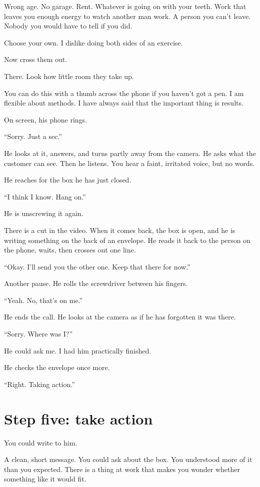 \documentclass[11pt,oneside]{book}
\begin{document}
Wrong age. No garage. Rent. Whatever is going on with your teeth. Work that leaves you enough energy to watch another man work. A person you can't leave. Nobody you would have to tell if you did.

Choose your own. I dislike doing both sides of an exercise.

Now cross them out.

There. Look how little room they take up.

You can do this with a thumb across the phone if you haven't got a pen. I am flexible about methods. I have always said that the important thing is results.

On screen, his phone rings.

``Sorry. Just a sec.''

He looks at it, answers, and turns partly away from the camera. He asks what the customer can see. Then he listens. You hear a faint, irritated voice, but no words.

He reaches for the box he has just closed.

``I think I know. Hang on.''

He is unscrewing it again.

There is a cut in the video. When it comes back, the box is open, and he is writing something on the back of an envelope. He reads it back to the person on the phone, waits, then crosses out one line.

``Okay. I'll send you the other one. Keep that there for now.''

Another pause. He rolls the screwdriver between his fingers.

``Yeah. No, that's on me.''

He ends the call. He looks at the camera as if he has forgotten it was there.

``Sorry. Where was I?''

He could ask me. I had him practically finished.

He checks the envelope once more.

``Right. Taking action.''

\section*{Step five: take action}

You could write to him.

A clean, short message. You could ask about the box. You understood more of it than you expected. There is a thing at work that makes you wonder whether something like it would fit.
\end{document}
